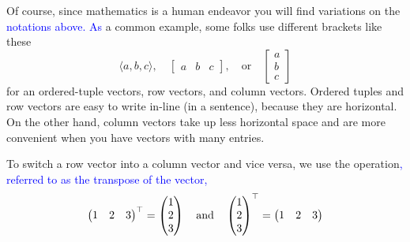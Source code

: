 \documentclass{ximera}
\begin{document}
\begin{concept}
\begin{description}
\end{description}
\end{concept}

Of course, since mathematics is a human endeavor you will find variations on the \textcolor{blue}{notations above. As} a common example, some folks use different brackets like these
\[
\langle a, b, c\rangle, \quad \begin{bmatrix} a & b & c \end{bmatrix}, \quad \text{or}\quad
\begin{bmatrix}
  a\\
  b\\
  c
\end{bmatrix}
\]
for an ordered-tuple vectors, row vectors, and column vectors. Ordered
tuples and row vectors are easy to write in-line (in a sentence),
because they are horizontal. On the other hand, column vectors take up
less horizontal space and are more convenient when you have vectors
with many entries.


\begin{definition}
  To switch a row vector into a column vector and vice versa, we use the  operation\textcolor{blue}{, referred to as the transpose of the vector,}
  \[
  \begin{pmatrix} 1 &  2 & 3 \end{pmatrix}^\top =
  \begin{pmatrix} 1 \\ 2 \\ 3 \end{pmatrix}
  \quad\text{and}\quad
  \begin{pmatrix} 1 \\ 2 \\ 3 \end{pmatrix}^\top =
  \begin{pmatrix} 1 &  2 & 3 \end{pmatrix}
  \]
\end{definition}
\end{document}
